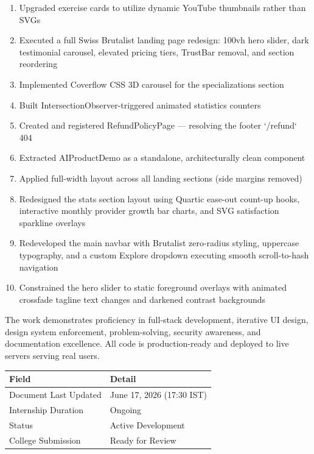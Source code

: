 \documentclass[11pt,a4paper]{article}
\begin{document}
\begin{itemize}
{\begin{enumerate}
  \item Upgraded exercise cards to utilize dynamic YouTube thumbnails rather than SVGs
  \item Executed a full Swiss Brutalist landing page redesign: 100vh hero slider, dark testimonial carousel, elevated pricing tiers, TrustBar removal, and section reordering
  \item Implemented Coverflow CSS 3D carousel for the specializations section
  \item Built IntersectionObserver-triggered animated statistics counters
  \item Created and registered RefundPolicyPage — resolving the footer `/refund` 404
  \item Extracted AIProductDemo as a standalone, architecturally clean component
  \item Applied full-width layout across all landing sections (side margins removed)
  \item Redesigned the stats section layout using Quartic ease-out count-up hooks, interactive monthly provider growth bar charts, and SVG satisfaction sparkline overlays
  \item Redeveloped the main navbar with Brutalist zero-radius styling, uppercase typography, and a custom Explore dropdown executing smooth scroll-to-hash navigation
  \item Constrained the hero slider to static foreground overlays with animated crossfade tagline text changes and darkened contrast backgrounds
\end{enumerate}

The work demonstrates proficiency in full-stack development, iterative UI design,
design system enforcement, problem-solving, security awareness, and documentation
excellence. All code is production-ready and deployed to live servers serving real users.

\vspace{1.5em}

\begin{table}[h!]
\centering
\begin{tabularx}{\textwidth}{l X}
\toprule
\textbf{Field} & \textbf{Detail} \\
\midrule
Document Last Updated & June 17, 2026 (17:30 IST) \\
Internship Duration   & Ongoing \\
Status                & Active Development \\
College Submission    & Ready for Review \\
\bottomrule
\end{tabularx}
\end{table}

}
\end{itemize}
\end{document}

